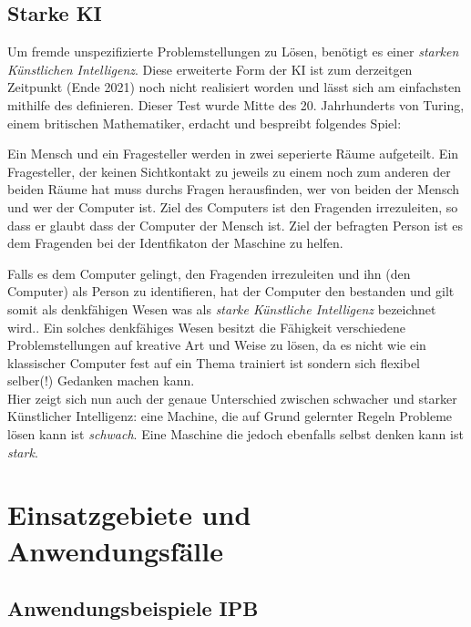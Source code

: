 \documentclass[12pt]{report}
\begin{document}
    \section{Starke KI}
    Um fremde unspezifizierte Problemstellungen zu Lösen, benötigt es einer \emph{starken Künstlichen Intelligenz}.
    Diese erweiterte Form der KI ist zum derzeitgen Zeitpunkt (Ende 2021) noch nicht realisiert worden und lässt sich am
    einfachsten mithilfe des  definieren. Dieser Test wurde Mitte des 20. Jahrhunderts von
    Turing, einem britischen Mathematiker, erdacht und bespreibt folgendes Spiel:
    \begin{displayquote}
        Ein Mensch und ein Fragesteller werden in zwei seperierte
        Räume aufgeteilt. Ein Fragesteller, der keinen Sichtkontakt zu jeweils zu einem noch zum anderen der beiden Räume hat
        muss durchs Fragen herausfinden, wer von beiden der Mensch und wer der Computer ist.
        Ziel des Computers ist den Fragenden irrezuleiten, so dass er glaubt dass der Computer der Mensch ist.
        Ziel der befragten Person ist es dem Fragenden bei der Identfikaton der Maschine zu helfen.
    \end{displayquote}
    Falls es dem Computer gelingt, den Fragenden irrezuleiten und ihn (den Computer) als Person zu identifieren, hat der Computer
    den  bestanden und gilt somit als denkfähigen Wesen was als \emph{starke Künstliche Intelligenz}
    bezeichnet wird.. Ein solches denkfähiges Wesen besitzt die Fähigkeit verschiedene Problemstellungen
    auf kreative Art und Weise zu lösen, da es nicht wie ein klassischer Computer fest auf ein Thema trainiert ist sondern
    sich flexibel selber(!) Gedanken machen kann.\\

    Hier zeigt sich nun auch der genaue Unterschied zwischen schwacher und starker Künstlicher Intelligenz: eine Machine,
    die auf Grund gelernter Regeln Probleme lösen kann ist \emph{schwach}. Eine Maschine die jedoch ebenfalls selbst denken
    kann ist \emph{stark}.


    \chapter{Einsatzgebiete und Anwendungsfälle}
    \section{Anwendungsbeispiele IPB}
\end{document}

